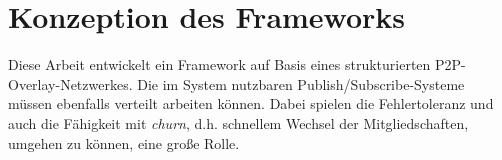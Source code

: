 \chapter{Konzeption des Frameworks}
\label{chap:konzeption_pubsub}
Diese Arbeit entwickelt ein Framework auf Basis eines strukturierten P2P-Overlay-Netzwerkes. Die im System nutzbaren Publish/Subscribe-Systeme müssen ebenfalls verteilt arbeiten können. Dabei spielen die Fehlertoleranz und auch die Fähigkeit mit \emph{churn}, d.h. schnellem Wechsel der Mitgliedschaften, umgehen zu können, eine große Rolle.





\cite{BeFiMu2006PubSubQoS}


\cite{KostasKatrinis2005}
